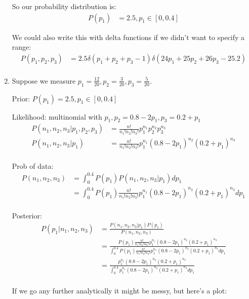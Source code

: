 \begin{enumerate}[label=\textbf{\Alph*}.]
    So our probability distribution is:
    \begin{align*}
        P(p_1) &= 2.5, p_1 \in [0, 0.4]
    \end{align*}

    We could also write this with delta functions if we didn't want to specify a range:
    \begin{align*}
        P(p_1, p_2, p_3) &= 2.5\delta(p_1+p_2+p_3-1)\delta(24p_1 + 25p_2 + 26p_3 - 25.2)\\
    \end{align*}

    \item Suppose we measure $p_1 = \frac{12}{20}, p_2 = \frac{3}{20}, p_3 = \frac{5}{20}$.

    Prior: $P(p_1) = 2.5, p_1 \in [0, 0.4]$

    Likelihood: multinomial with $p_1, p_2 = 0.8 - 2p_1, p_3 = 0.2 + p_1$
    \begin{align*}
        P(n_1, n_2, n_3|p_1, p_2, p_3) &= \frac{n!}{n_1!n_2!n_3!}p_1^{n_1}p_2^{n_2}p_3^{n_3}\\
        P(n_1, n_2, n_3|p_1) &= \frac{n!}{n_1!n_2!n_3!}p_1^{n_1}(0.8 - 2p_1)^{n_2}(0.2 + p_1)^{n_3} \\
    \end{align*}

    Prob of data:
    \begin{align*}
        P(n_1, n_2, n_3) &= \int_0^{0.4} P(p_1)P(n_1, n_2, n_3 | p_1)dp_1 \\
        &= \int_0^{0.4} P(p_1)\frac{n!}{n_1!n_2!n_3!}p_1^{n_1}(0.8 - 2p_1)^{n_2}(0.2 + p_1)^{n_3}dp_1 \\
    \end{align*}

    Posterior:
    \begin{align*}
        P(p_1| n_1, n_2, n_3) &= \frac{P(n_1, n_2, n_3| p_1)P(p_1)}{P(n_1, n_2, n_3)}\\
        &= \frac{P(p_1)\frac{n!}{n_1!n_2!n_3!}p_1^{n_1}(0.8 - 2p_1)^{n_2}(0.2 + p_1)^{n_3}}{\int_0^{0.4} P(p_1)\frac{n!}{n_1!n_2!n_3!}p_1^{n_1}(0.8 - 2p_1)^{n_2}(0.2 + p_1)^{n_3}dp_1}\\
        &= \frac{p_1^{n_1}(0.8 - 2p_1)^{n_2}(0.2 + p_1)^{n_3}}{\int_0^{0.4} p_1^{n_1}(0.8 - 2p_1)^{n_2}(0.2 + p_1)^{n_3}dp_1}\\
    \end{align*}

    \newpage
    If we go any further analytically it might be messy, but here's a plot:


\end{enumerate}
